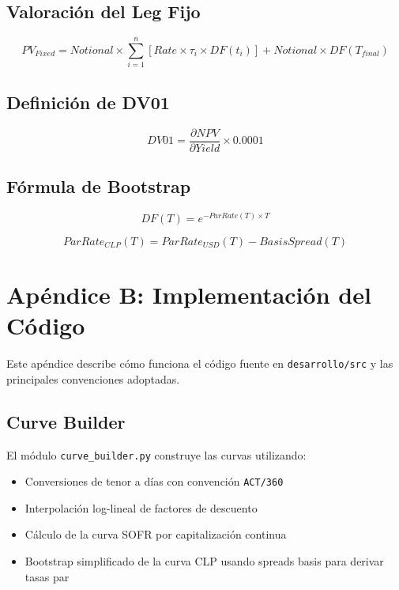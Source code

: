 \documentclass[12pt,a4paper]{article}
\begin{document}
\subsection*{Valoración del Leg Fijo}
\begin{equation}
PV_{Fixed} = Notional \times \sum_{i=1}^{n} \left[ Rate \times \tau_i \times DF(t_i) \right] + Notional \times DF(T_{final})
\end{equation}

\subsection*{Definición de DV01}
\begin{equation}
DV01 = \frac{\partial NPV}{\partial Yield} \times 0.0001
\end{equation}

\subsection*{Fórmula de Bootstrap}
\begin{equation}
DF(T) = e^{-ParRate(T) \times T}
\end{equation}

\begin{equation}
ParRate_{CLP}(T) = ParRate_{USD}(T) - BasisSpread(T)
\end{equation}

\section*{Apéndice B: Implementación del Código}
Este apéndice describe cómo funciona el código fuente en \texttt{desarrollo/src} y las principales convenciones adoptadas.

\subsection*{Curve Builder}
El módulo \texttt{curve_builder.py} construye las curvas utilizando:
\begin{itemize}
    \item Conversiones de tenor a días con convención \texttt{ACT/360}
    \item Interpolación log-lineal de factores de descuento
    \item Cálculo de la curva SOFR por capitalización continua
    \item Bootstrap simplificado de la curva CLP usando spreads basis para derivar tasas par
\end{itemize}
\end{document}
